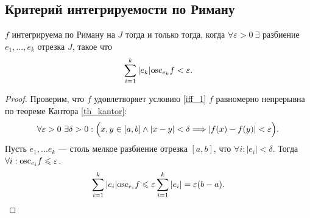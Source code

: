 \documentclass[11pt]{book}
\newcommand{\slim}{\sum\limits}
\newcommand{\osc}{{\mathop{\text{\rm osc}}}}
\renewcommand{\le}{\leqslant}
\theoremstyle{definition}
\theoremstyle{plain}
\theoremstyle{plain}
\theoremstyle{definition}
\theoremstyle{remark}
\begin{document}
\subsection{Критерий интегрируемости по Риману}
\begin{thm}
    $ f$   интегрируема по Риману на $ J$ тогда и только тогда, когда $ \forall  \varepsilon >0 ~ \exists $ разбиение $ e_1, \ldots,  e_k$ отрезка $ J$, такое что
    \begin{align}
	\slim_{i=1}^{k}|e_k| \osc_{e_k} f < \varepsilon . \label{iff_1}
    \end{align}
\end{thm}
\begin{proof}
    Проверим, что $ f$ удовлетворяет условию  \ref{iff_1}
    $ f$ равномерно непрерывна по теореме Кантора \ref{th_kantor}:
    \[
	\forall		\varepsilon >0 ~ \exists \delta  >0: \Bigl( x, y \in  [a, b] \wedge  |x-y| < \delta  \Longrightarrow  |f(x) - f(y)| < \varepsilon  \Bigr)
    .\]
    Пусть $ e_1, \ldots e_k$ --- столь мелкое разбиение отрезка $ [a, b]$, что $ \forall i: |e_i| < \delta $. Тогда  $ \forall i: \osc_{e_i}f \le \varepsilon $.
    \[
	\sum_{i=1}^{k} |e_i|\osc_{e_i} f \le \varepsilon \sum_{i=1}^{k}|e_i| = \varepsilon (b-a)
    .\]
\end{proof}
\end{document}
